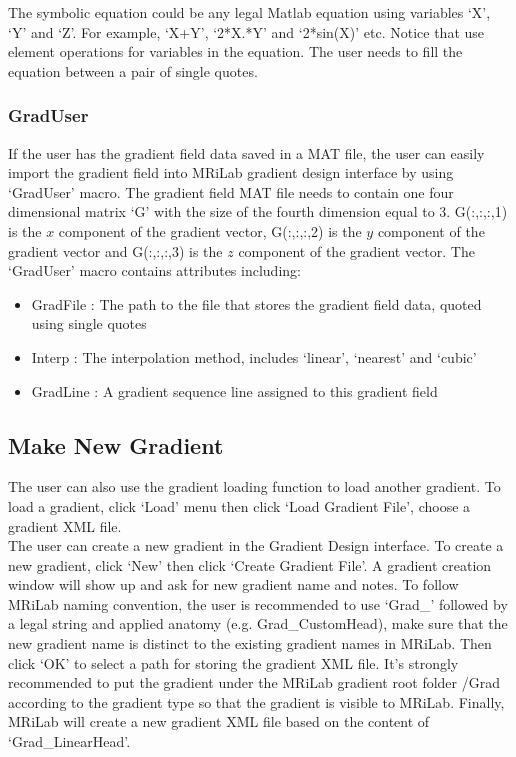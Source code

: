 \documentclass{book}%
\begin{document}
The symbolic equation could be any legal Matlab equation using variables `X', `Y' and `Z'. For example, `X+Y', `2*X.*Y' and `2*sin(X)' etc. Notice that use element operations for variables in the equation. The user needs to fill the equation between a pair of single quotes.

\subsubsection{GradUser}

If the user has the gradient field data saved in a MAT file, the user can easily import the gradient field into MRiLab gradient design interface by using `GradUser' macro. The gradient field MAT file needs to contain one four dimensional matrix `G' with the size of the fourth dimension equal to 3. G(:,:,:,1) is the $x$ component of the gradient vector, G(:,:,:,2) is the $y$ component of the gradient vector and G(:,:,:,3) is the $z$ component of the gradient vector. The `GradUser' macro contains attributes including:

\begin{itemize}
	\item GradFile : The path to the file that stores the gradient field data, quoted using single quotes
	\item Interp : The interpolation method, includes `linear', `nearest' and `cubic'
	\item GradLine : A gradient sequence line assigned to this gradient field
\end{itemize}


\subsection{Make New Gradient}

The user can also use the gradient loading function to load another gradient. To load a gradient, click `Load' menu then click `Load Gradient File', choose a gradient XML file.\\

The user can create a new gradient in the Gradient Design interface. To create a new gradient, click `New' then click `Create Gradient File'. A gradient creation window will show up and ask for new gradient name and notes. To follow MRiLab naming convention, the user is recommended to use `Grad\_' followed by a legal string and applied anatomy (e.g. Grad\_CustomHead), make sure that the new gradient name is distinct to the existing gradient names in MRiLab. Then click `OK' to select a path for storing the gradient XML file. It's strongly recommended to put the gradient under the MRiLab gradient root folder /Grad according to the gradient type so that the gradient is visible to MRiLab. Finally, MRiLab will create a new gradient XML file based on the content of `Grad\_LinearHead'.
\end{document}
